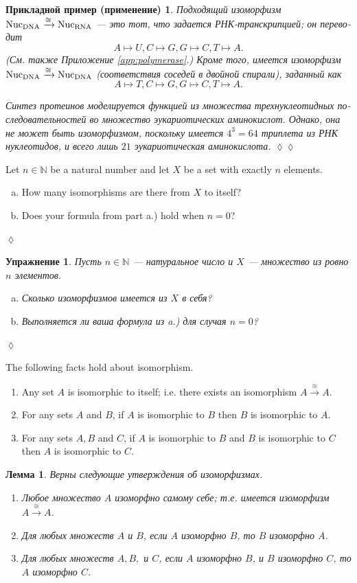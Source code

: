 \documentclass[a4paper]{book}
\def\tn{\textnormal}
\def\NN{{\mathbb N}}
\def\iso{\cong}
\newcommand{\To}[1]{\xrightarrow{#1}}
\theoremstyle{myth}
\newtheorem{lemmaENG}[envENG]{\begin{english}Lemma\end{english}}
\newtheorem{excENG}[envENG]{\begin{english}Exercise\end{english}}
\newenvironment{exerciseENG}{\begin{excENG}}{\hspace*{\fill}$\lozenge$\end{excENG}}
\newtheorem{lemmaRUS}[envRUS]{Лемма}
\newtheorem{excRUS}[envRUS]{Упражнение}
\newtheorem{appRUS}[envRUS]{Прикладной пример (применение)}
\newenvironment{exerciseRUS}{\begin{excRUS}}{\hspace*{\fill}$\lozenge$\end{excRUS}}
\newenvironment{applicationRUS}{\begin{appRUS}}{\hspace*{\fill}$\lozenge\lozenge$\end{appRUS}}
\def\sexc{\begin{enumerate}[a.)]\setlength{\itemsep}{.1cm}\setlength{\parskip}{.1cm}\item}
\def\next{\item}
\def\endsexc{\end{enumerate}}
\begin{document}
\begin{russian}
\begin{applicationRUS}
Подходящий изоморфизм $\tn{Nuc}_\tn{DNA}\To{\iso}\tn{Nuc}_\tn{RNA}$ — это тот, что задается РНК-транскрипцией; он переводит
$$A\mapsto U, C\mapsto G, G\mapsto C, T\mapsto A.$$ 
(См. также Приложение \ref{app:polymerase}.) Кроме того, имеется изоморфизм $\tn{Nuc}_\tn{DNA}\To{\iso}\tn{Nuc}_\tn{DNA}$ (соответствия соседей в двойной спирали), заданный как  
$$A\mapsto T, C\mapsto G, G\mapsto C, T\mapsto A.$$

Синтез протеинов моделируется функцией из множества трехнуклеотидных последовательностей во множество эукариотических аминокислот. Однако, она не может быть изоморфизмом, поскольку имеется $4^3=64$ триплета из РНК нуклеотидов, и всего лишь $21$ эукариотическая аминокислота. 
\end{applicationRUS}

\begin{exerciseENG}
Let $n\in\NN$ be a natural number and let $X$ be a set with exactly $n$ elements. 
\sexc How many isomorphisms are there from $X$ to itself? 
\next Does your formula from part a.) hold when $n=0$?
\endsexc
\end{exerciseENG}

\begin{exerciseRUS}
Пусть $n\in\NN$ — натуральное число и $X$ — множество из ровно $n$ элементов. 
\sexc Сколько изоморфизмов имеется из $X$ в себя? 
\next Выполняется ли ваша формула из a.) для случая $n=0$?
\endsexc 
\end{exerciseRUS}

\begin{lemmaENG}\label{lemma:isomorphic ER in Set}
The following facts hold about isomorphism.
\begin{enumerate}
\item Any set $A$ is isomorphic to itself; i.e. there exists an isomorphism $A\To{\iso} A$.
\item For any sets $A$ and $B$, if $A$ is isomorphic to $B$ then $B$ is isomorphic to $A$.
\item For any sets $A, B$ and $C$, if $A$ is isomorphic to $B$ and $B$ is isomorphic to $C$ then $A$ is isomorphic to $C$.
\end{enumerate}
\end{lemmaENG}

\begin{lemmaRUS}\label{lemma:isomorphic ER in Set}
Верны следующие утверждения об изоморфизмах.
\begin{enumerate}
\item Любое множество $A$ изоморфно самому себе; т.е. имеется изоморфизм $A\To{\iso} A$.
\item Для любых множеств $A$ и $B$, если $A$ изоморфно $B$, то $B$ изоморфно $A$.
\item Для любых множеств $A, B,$ и $C$, если $A$ изоморфно $B$, и $B$ изоморфно $C$, то $A$ изоморфно $C$.
\end{enumerate}
\end{lemmaRUS}


\end{russian}
\end{document}
